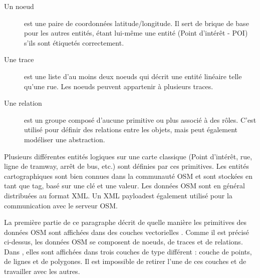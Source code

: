 \begin{description}
\item[Un noeud] est une paire de coordonnées latitude/longitude. Il sert de brique de base pour les autres entités, étant lui-même une entité (Point d'intérêt - POI) s'ils sont étiquetés correctement.
\item[Une trace] est une liste d'au moins deux noeuds qui décrit une entité linéaire telle qu'une rue. Les noeuds peuvent appartenir à plusieurs traces.
\item[Une relation] est un groupe composé d'aucune primitive ou plus associé à des rôles. C'est utilisé pour définir des relations entre les objets, mais peut également modéliser une abstraction.
\end{description}

Plusieurs différentes entités logiques sur une carte classique (Point d'intérêt, rue, ligne de tramway, arrêt de bus, etc.) sont définies par ces primitives. Les entités cartographiques sont bien connues dans la communauté OSM et sont stockées en tant que \og tag\fg, basé sur une clé et une valeur. Les données OSM sont en général distribuées au format XML. Un \og XML payload\fg est également utilisé pour la communication avec le serveur OSM.

\label{qgis-osm-connection}

La première partie de ce paragraphe décrit de quelle manière les primitives des données OSM sont affichées dans des couches vectorielles \qg. Comme il est précisé ci-dessus, les données OSM se composent de noeuds, de traces et de relations. Dans \qg, elles sont affichées dans trois couches de type différent : couche de points, de lignes et de polygones. Il est impossible de retirer l'une de ces couches et de travailler avec les autres.

